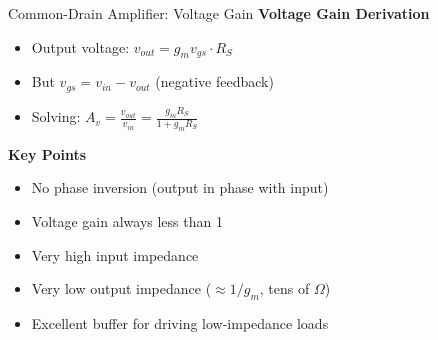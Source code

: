 \documentclass[10pt, aspectratio=169]{beamer}
\newcommand{\baditem}{\textcolor{red!70!black}{\frownie}}
\newcommand{\gooditem}{\textcolor{green!60!black}{\smiley}}
\begin{document}
\begin{frame}{Common-Drain Amplifier: Voltage Gain}
\textbf{Voltage Gain Derivation}
\begin{itemize}
\item Output voltage: $v_{out} = g_m v_{gs} \cdot R_S$
\item But $v_{gs} = v_{in} - v_{out}$ (negative feedback)
\item Solving: $A_v = \frac{v_{out}}{v_{in}} = \frac{g_m R_S}{1 + g_m R_S}$
\end{itemize}

\vspace{0.5cm}
\textbf{Key Points}
\begin{itemize}
\item \gooditem No phase inversion (output in phase with input)
\item \baditem Voltage gain always less than 1 
\item \gooditem Very high input impedance
\item \gooditem Very low output impedance ($\approx 1/g_m$, tens of $\Omega$)
\item \gooditem Excellent buffer for driving low-impedance loads
\end{itemize}
\end{frame}

\end{document}
